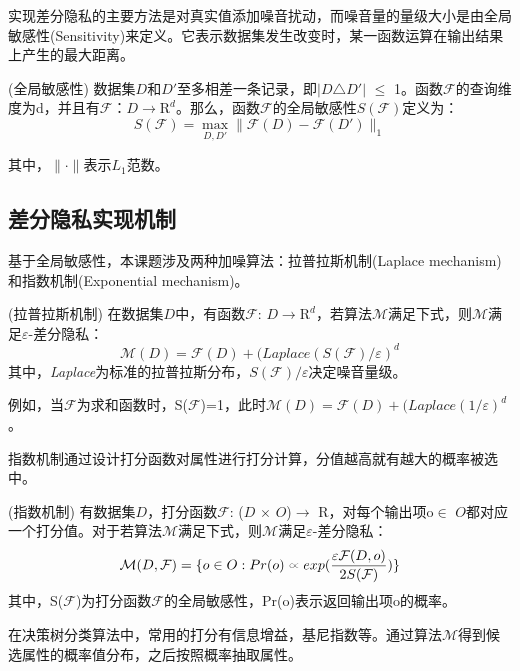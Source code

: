 实现差分隐私的主要方法是对真实值添加噪音扰动，而噪音量的量级大小是由全局敏感性(Sensitivity)来定义。它表示数据集发生改变时，某一函数运算在输出结果上产生的最大距离。

\begin{defn}
	(\textsc{全局敏感性}\cite{Dwork Calibrating}) 数据集$D$和$D'$至多相差一条记录，即$|D$$\triangle$$D'|$ $\leqslant$ 1。函数$\mathcal{F}$的查询维度为d，并且有$\mathcal{F}$：$D \rightarrow \mathrm{R}^d$。那么，函数$\mathcal{F}$的全局敏感性$S(\mathcal{F})$定义为：
\begin{equation}
\label{eq:res2}
	S(\mathcal{F}) = \max \limits_{D,D'} \| \mathcal{F}(D) - \mathcal{F}(D') \|_{1}
\end{equation}

其中，$\|\cdot\|$表示$L_{1}$范数。
\end{defn}

\subsection{差分隐私实现机制}

基于全局敏感性，本课题涉及两种加噪算法：拉普拉斯机制(Laplace mechanism)和指数机制(Exponential mechanism)。

\begin{thm}
	\label{thm:res1}
	(\textsc{拉普拉斯机制}\cite{Dwork Calibrating}) 在数据集$D$中，有函数$\mathcal{F}$: $D\rightarrow \mathrm{R}^d$，若算法$\mathcal{M}$满足下式，则$\mathcal{M}$满足$\varepsilon$-差分隐私：
	\begin{equation}
	\mathcal{M}(D) = \mathcal{F}(D) + (\textit{Laplace}(S(\mathcal{F})/ \varepsilon)^d
	\end{equation}
	其中，\textit{Laplace}为标准的拉普拉斯分布，$S(\mathcal{F})/\varepsilon$决定噪音量级。
\end{thm}
例如，当$\mathcal{F}$为求和函数时，S($\mathcal{F}$)=1，此时$\mathcal{M}(D) = \mathcal{F}(D) + (\textit{Laplace}(1/\varepsilon)^d$。

指数机制通过设计打分函数对属性进行打分计算，分值越高就有越大的概率被选中。
\begin{thm}
	\label{thm:res2}
	(\textsc{指数机制}\cite{exponential}) 有数据集$D$，打分函数$\mathcal{F}$: ($D$ $\times$ $O$)$\rightarrow$ $\mathrm{R}$，对每个输出项o$\in$ $O$都对应一个打分值。对于若算法$\mathcal{M}$满足下式，则$\mathcal{M}$满足$\varepsilon$-差分隐私：
	\begin{equation}
	\mathcal{M}(D,\mathcal{F}) = \{o \in O: Pr(o)\wasypropto exp(\frac{\varepsilon\mathcal{F}(D,o)}{2S(\mathcal{F})}) \}
	\end{equation}
	其中，S($\mathcal{F}$)为打分函数$\mathcal{F}$的全局敏感性，Pr(o)表示返回输出项o的概率。
\end{thm}
在决策树分类算法中，常用的打分有信息增益，基尼指数等。通过算法$\mathcal{M}$得到候选属性的概率值分布，之后按照概率抽取属性。

